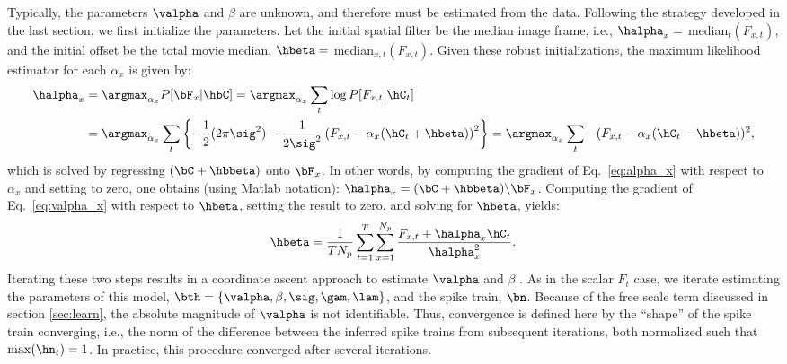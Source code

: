 Typically, the parameters  $\valpha$ and $\beta$ are unknown, and therefore must be estimated from the data.  Following the strategy developed in the last section, we first initialize the parameters.  Let the initial spatial filter be the median image frame, i.e., $\halpha_x=$ median$_t(F_{x,t})$, and the initial offset be the total movie median, $\hbeta=$ median$_{x,t}(F_{x,t})$.  Given these robust initializations, the maximum likelihood estimator for each $\alpha_x$ is given by:
\begin{subequations} \label{eq:valpha_x}
\begin{align}
\halpha_x &= \argmax_{\alpha_x} P[\bF_x | \hbC] = \argmax_{\alpha_x} \sum_t \log P[F_{x,t} | \hC_t] \\
&=\argmax_{\alpha_x} \sum_t  \left\{-\frac{1}{2} (2\pi \sig^2) - \frac{1}{2\sig^2}\left(F_{x,t} - \alpha_x (\hC_t + \hbeta)\right)^2 \right\} %
= \argmax_{\alpha_x} \sum_t - (F_{x,t} - \alpha_x(\hC_t - \hbeta))^2, \label{eq:alpha_x}
\end{align}
\end{subequations}
which is solved by regressing $(\bC + \hbbeta)$ onto $\bF_x$.  In other words, by computing the gradient of Eq.~\eqref{eq:alpha_x} with respect to $\alpha_x$ and setting to zero, one obtains (using Matlab notation): $\halpha_x = (\bC + \hbbeta)\backslash \bF_x$. %
Computing the gradient of Eq.~\eqref{eq:valpha_x} with respect to $\hbeta$, setting the result to zero, and solving for $\hbeta$, yields:
\begin{align} \label{eq:beta}
	\hbeta = \frac{1}{T N_p} \sum_{t=1}^T \sum_{x=1}^{N_p} \frac{F_{x,t} + \halpha_x  \hC_t}{\halpha_x^2}.
\end{align} 
Iterating these two steps results in a coordinate ascent approach to estimate $\valpha$ and $\beta$ \cite{CONV04}. As in the scalar $F_t$ case, we iterate estimating the parameters of this model, $\bth = \{\valpha, \beta, \sig, \gam, \lam\}$, and the spike train, $\bn$.  Because of the free scale term discussed in section \ref{sec:learn}, the absolute magnitude of $\valpha$ is not identifiable.  Thus, convergence is defined here by the ``shape'' of the spike train converging, i.e., the norm of the difference between the inferred spike trains from subsequent iterations, both normalized such that $\max(\hn_t)=1$.  In practice, this procedure converged after several iterations.





